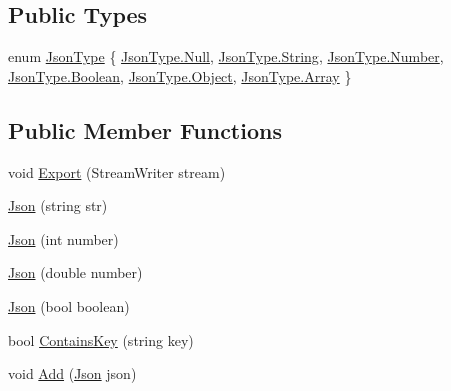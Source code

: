 \subsection*{Public Types}
\begin{DoxyCompactItemize}
\item 
enum \mbox{\hyperlink{class_eagle_eye_1_1_models_1_1_json_afdf0e16163f8b9bab5b45d6d01e8133c}{Json\+Type}} \{ \newline
\mbox{\hyperlink{class_eagle_eye_1_1_models_1_1_json_afdf0e16163f8b9bab5b45d6d01e8133cabbb93ef26e3c101ff11cdd21cab08a94}{Json\+Type.\+Null}}, 
\mbox{\hyperlink{class_eagle_eye_1_1_models_1_1_json_afdf0e16163f8b9bab5b45d6d01e8133ca27118326006d3829667a400ad23d5d98}{Json\+Type.\+String}}, 
\mbox{\hyperlink{class_eagle_eye_1_1_models_1_1_json_afdf0e16163f8b9bab5b45d6d01e8133cab2ee912b91d69b435159c7c3f6df7f5f}{Json\+Type.\+Number}}, 
\mbox{\hyperlink{class_eagle_eye_1_1_models_1_1_json_afdf0e16163f8b9bab5b45d6d01e8133ca27226c864bac7454a8504f8edb15d95b}{Json\+Type.\+Boolean}}, 
\newline
\mbox{\hyperlink{class_eagle_eye_1_1_models_1_1_json_afdf0e16163f8b9bab5b45d6d01e8133ca497031794414a552435f90151ac3b54b}{Json\+Type.\+Object}}, 
\mbox{\hyperlink{class_eagle_eye_1_1_models_1_1_json_afdf0e16163f8b9bab5b45d6d01e8133ca4410ec34d9e6c1a68100ca0ce033fb17}{Json\+Type.\+Array}}
 \}
\end{DoxyCompactItemize}
\subsection*{Public Member Functions}
\begin{DoxyCompactItemize}
\item 
void \mbox{\hyperlink{class_eagle_eye_1_1_models_1_1_json_ad911e1ca9e6ba8a8ae4c85152593c691}{Export}} (Stream\+Writer stream)
\item 
\mbox{\hyperlink{class_eagle_eye_1_1_models_1_1_json_ad5ccac28bacaf78710b8d7fb73911426}{Json}} (string str)
\item 
\mbox{\hyperlink{class_eagle_eye_1_1_models_1_1_json_a2b753342c141001d4d8ba07c2040728f}{Json}} (int number)
\item 
\mbox{\hyperlink{class_eagle_eye_1_1_models_1_1_json_aeab0ffd54a14d95ef7a275f665ef6d0c}{Json}} (double number)
\item 
\mbox{\hyperlink{class_eagle_eye_1_1_models_1_1_json_ae12564ad6ef249ccd5bbdd57560db23d}{Json}} (bool boolean)
\item 
bool \mbox{\hyperlink{class_eagle_eye_1_1_models_1_1_json_a140f24f32b5b39c66584f13eb2fbf586}{Contains\+Key}} (string key)
\item 
void \mbox{\hyperlink{class_eagle_eye_1_1_models_1_1_json_a4b23b3ec238276219d3d953b385fac93}{Add}} (\mbox{\hyperlink{class_eagle_eye_1_1_models_1_1_json}{Json}} json)
\end{DoxyCompactItemize}
